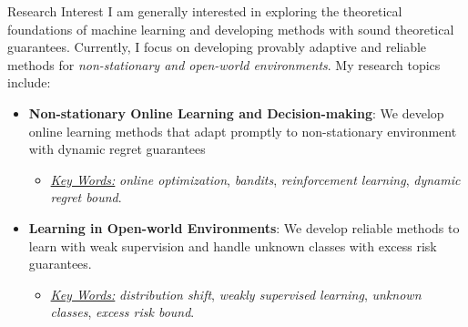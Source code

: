 \documentclass{resume} %
\begin{document}

\begin{rSection}{Research Interest}
I am generally interested in exploring the theoretical foundations of machine learning and developing methods with sound theoretical guarantees. Currently, I focus on developing provably adaptive and reliable methods for \emph{non-stationary and open-world environments}. My research topics include:
\begin{itemize}
	\item \textbf{Non-stationary Online Learning and Decision-making}: We develop online learning methods that adapt promptly to non-stationary environment with dynamic regret guarantees\vspace{-0.5mm}
	\begin{itemize}[label = {-}, left=- 2mm]
		\item \underline{\emph{Key Words:}} \emph{online optimization}, \emph{bandits}, \emph{reinforcement learning}, \emph{dynamic regret bound}.
	\end{itemize}\vspace{1.5mm}
	\item \textbf{Learning in Open-world Environments}: We develop reliable methods to learn with weak supervision and handle unknown classes with excess risk guarantees.\vspace{-0.5mm}
	\begin{itemize}[label = {-}, left = -2mm]
		\item \underline{\emph{Key Words:}} \emph{distribution shift}, \emph{weakly supervised learning}, \emph{unknown classes}, \emph{excess risk bound}. 
	\end{itemize}
\end{itemize}
\end{rSection}
\end{document}
